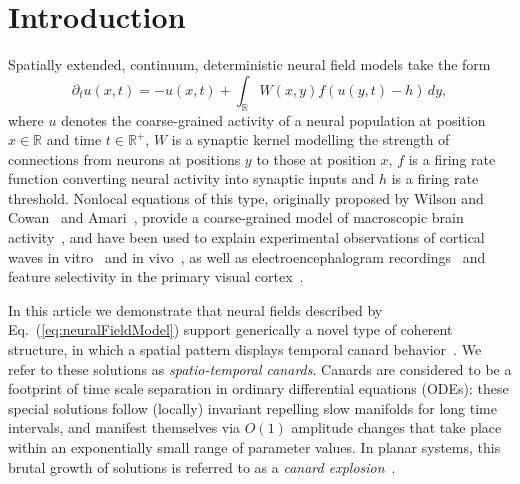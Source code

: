 \documentclass[aps,prl,reprint,superscriptaddress]{revtex4-1}
\newcommand{\RSet}{\mathbb{R}}
\begin{document}
\section{\label{sec:intro}Introduction}
Spatially extended, continuum, deterministic neural field models take the
form~\cite{Bressloff2012o,Bressloff:2014cm,Ermentrout:2010cga}
\begin{equation}\label{eq:neuralFieldModel}
  \partial_t u(x,t) = - u(x,t) + \int_{\RSet} W(x,y) f(u(y,t) - h) \, d y,
\end{equation}
where $u$ denotes the coarse-grained activity of a neural population
at position $x\in \RSet$ and time $t \in \RSet^+$, $W$ is a synaptic
kernel modelling the strength of connections from neurons at positions
$y$ to those at position $x$, $f$ is a firing rate function converting
neural activity into synaptic inputs and $h$ is a firing rate
threshold. Nonlocal equations of this type,
originally proposed by Wilson and Cowan~\cite{Wilson1972aa} and
Amari~\cite{Amari1975aa}, provide a coarse-grained model of macroscopic 
brain activity~\cite{Folias2005aa}, and have been used to explain experimental
observations of cortical waves in vitro~\cite{Richardson:2005cs} and in
vivo~\cite{Huang:2004kw,GonzalezRamirez:2015gk}, as well as electroencephalogram
recordings~\cite{SteynRoss:2003ep} and feature selectivity in the primary visual
cortex~\cite{Camperi:1998ji}.

In this article we demonstrate that neural fields described by
Eq.~(\ref{eq:neuralFieldModel}) support generically a novel type of coherent
structure, in which a spatial pattern displays temporal canard
behavior~\cite{Benoit1981}.  We refer to these solutions as \emph{spatio-temporal
canards}. Canards are considered to be a footprint of time scale separation in
ordinary differential equations (ODEs): these special solutions follow
(locally) invariant repelling slow manifolds for long time intervals,
and manifest themselves via $O(1)$ amplitude changes that take place 
within an exponentially small range of parameter values. In planar
systems, this brutal growth of solutions is referred to as a
\emph{canard explosion}~\cite{Benoit1981,Krupa2001}.
\end{document}
